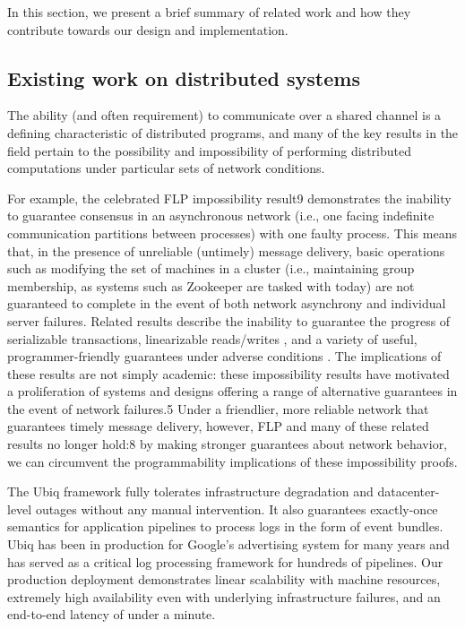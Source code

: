 In this section, we present a brief summary of related work and how they contribute towards
our design and implementation.


\subsection{Existing work on distributed systems}

The ability (and often requirement) to communicate over a shared channel is a defining characteristic of distributed
programs, and many of the key results in the field pertain to the possibility and impossibility of performing
distributed computations under particular sets of network conditions.

For example, the celebrated FLP impossibility result9 demonstrates the inability to guarantee consensus in an
asynchronous network (i.e., one facing indefinite communication partitions between processes) with one faulty process.
This means that, in the presence of unreliable (untimely) message delivery, basic operations such as modifying the set
of machines in a cluster (i.e., maintaining group membership, as systems such as Zookeeper are tasked with today) are
not guaranteed to complete in the event of both network asynchrony and individual server failures. Related results
describe the inability to guarantee the progress of serializable transactions\cite{Davidson1985}, linearizable
reads/writes \cite{Gilbert2002}, and a variety of useful, programmer-friendly guarantees under adverse conditions
\cite{Bailis2013}. The implications of these results are not simply academic: these impossibility results have motivated
a proliferation of systems and designs offering a range of alternative guarantees in the event of network failures.5
Under a friendlier, more reliable network that guarantees timely message delivery, however, FLP and many of these
related results no longer hold:8 by making stronger guarantees about network behavior, we can circumvent the
programmability implications of these impossibility proofs.


The Ubiq \cite{ubiq}framework fully tolerates infrastructure degradation and datacenter-level outages without any manual
intervention. It also guarantees exactly-once semantics for application pipelines to process logs in the form of event
bundles. Ubiq has been in production for Google’s advertising system for many years and has served as a critical log
processing framework for hundreds of pipelines. Our production deployment demonstrates linear scalability with machine
resources, extremely high availability even with underlying infrastructure failures, and an end-to-end latency of under
a minute.

